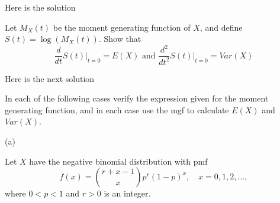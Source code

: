 \documentclass[12pt,letterpaper]{exam}
\begin{document}
\begin{questions}
	
	\begin{solution}
		Here is the solution
	\end{solution}
	
	\setcounter{question}{31}
	\question  Let $M_X(t)$ be the moment generating function of $X$, and define $S(t) = \log{(M_X(t))}$. Show that
	$$ \frac{d}{dt} \left. S(t) \right|_{t=0} = E(X) \text{ and }  \frac{d^2}{dt^2} \left. S(t) \right|_{t=0} = Var(X)$$
	\begin{solution}
		Here is the next solution
	\end{solution}
	
	\question  In each of the following cases verify the expression given for the moment generating function, and in each case use the mgf to calculate $E(X)$ and $Var(X)$.
	
	\begin{solution}
		(a)
		
	\end{solution}
	
	\setcounter{question}{37}
	\question  Let $X$ have the negative binomial distribution with pmf
	$$ f(x) = { r + x -1 \choose x} p^r (1-p)^x, \quad x= 0,1,2,...,$$
	where $0 < p< 1$ and $r >0$ is an integer.
	\begin{parts}

\end{parts}
\end{questions}
\end{document}

